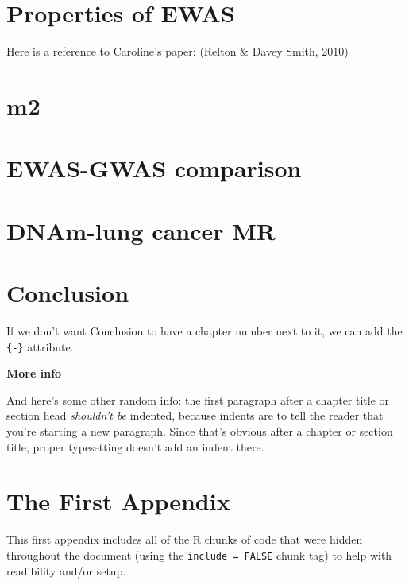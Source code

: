 \documentclass[11pt,twoside]{bristolthesis}
\begin{document}
\hypertarget{properties-of-ewas}{%
\chapter{Properties of EWAS}\label{properties-of-ewas}}

Here is a reference to Caroline's paper: (Relton \& Davey Smith, 2010)

\hypertarget{m2}{%
\chapter{m2}\label{m2}}

\hypertarget{ewas-gwas-comparison}{%
\chapter{EWAS-GWAS comparison}\label{ewas-gwas-comparison}}

\hypertarget{dnam-lung-cancer-mr}{%
\chapter{DNAm-lung cancer MR}\label{dnam-lung-cancer-mr}}

\hypertarget{conclusion}{%
\chapter*{Conclusion}\label{conclusion}}

If we don't want Conclusion to have a chapter number next to it, we can add the \texttt{\{-\}} attribute.

\textbf{More info}

And here's some other random info: the first paragraph after a chapter title or section head \emph{shouldn't be} indented, because indents are to tell the reader that you're starting a new paragraph. Since that's obvious after a chapter or section title, proper typesetting doesn't add an indent there.

\appendix

\hypertarget{the-first-appendix}{%
\chapter{The First Appendix}\label{the-first-appendix}}

This first appendix includes all of the R chunks of code that were hidden throughout the document (using the \texttt{include\ =\ FALSE} chunk tag) to help with readibility and/or setup.
\end{document}
